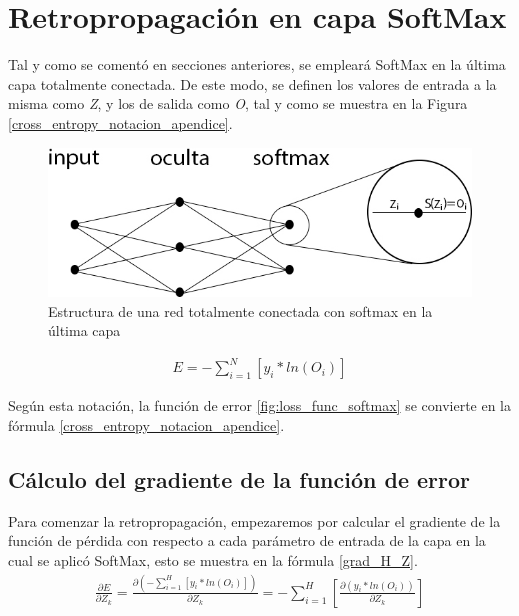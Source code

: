 
\chapter{Retropropagación en capa SoftMax} \label{softmax_apendice}


Tal y como se comentó en secciones anteriores, se empleará SoftMax en la última capa totalmente conectada. De este modo, se definen los valores de entrada a la misma como \textit{Z}, y los de salida como \textit{O}, tal y como se muestra en la Figura \ref{cross_entropy_notacion_apendice}.

\begin{figure}[H]
	\centering
	\includegraphics[scale=0.4]{imagenes/NN_softmax.jpg}  
	\caption{Estructura de una red totalmente conectada con softmax en la última capa}
\end{figure}

\begin{gather}
	E = - \sum_{i=1}^{N}  [y_i * ln(O_i)] 
	\label{cross_entropy_notacion_apendice}
\end{gather}

Según esta notación, la función de error \ref{fig:loss_func_softmax} se convierte en la fórmula \ref{cross_entropy_notacion_apendice}.

\section{Cálculo del gradiente de la función de error}

Para comenzar la retropropagación, empezaremos por calcular el gradiente de la función de pérdida con respecto a cada parámetro de entrada de la capa en la cual se aplicó SoftMax, esto se muestra en la fórmula \ref{grad_H_Z}.
\begin{gather}
	\frac{\partial E}{\partial Z_k} = \frac{\partial(- \sum_{i=1}^{H}  [y_i * ln(O_i)])}{\partial Z_k} = - \sum_{i=1}^{H}  [\frac{\partial(y_i * ln(O_i))}{\partial Z_k}] 
	\label{grad_H_Z}
\end{gather}

